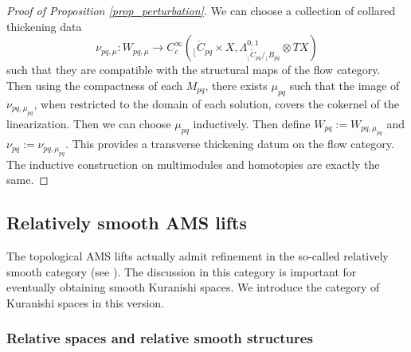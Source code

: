 \documentclass[reqno, 10pt]{amsart}
\numberwithin{equation}{section}
\numberwithin{equation}{section}
\theoremstyle{definition}
\theoremstyle{remark}
\newcommand{\beqn}{\begin{equation*}}
\newcommand{\eeqn}{\end{equation*}}
\renewcommand{\outer}{{}_{\lfloor}}
\begin{document}
\begin{proof}[Proof of Proposition \ref{prop_perturbation}]
We can choose a collection of collared thickening data
\beqn
\nu_{pq, \mu}: W_{pq, \mu} \to C_c^\infty( \outer \mathring C_{pq} \times X, \Lambda^{0,1}_{\outer \mathring C_{pq}/ \outer B_{pq}} \otimes TX)
\eeqn
such that they are compatible with the structural maps of the flow category. Then using the compactness of each $M_{pq}$, there exists $\mu_{pq}$ such that the image of $\nu_{pq, \mu_{pq}}$, when restricted to the domain of each solution, covers the cokernel of the linearization. Then we can choose $\mu_{pq}$ inductively. Then define $W_{pq}:= W_{pq, \mu_{pq}}$ and $\nu_{pq}:= \nu_{pq, \mu_{pq}}$. This provides a transverse thickening datum on the flow category. The inductive construction on multimodules and homotopies are exactly the same. 
\end{proof}









































\subsection{Relatively smooth AMS lifts}\label{subsection_relative_smooth}

The topological AMS lifts actually admit refinement in the so-called relatively smooth category (see \cite{Hirschi_Swaminathan}). The discussion in this category is important for eventually obtaining smooth Kuranishi spaces. We introduce the category of Kuranishi spaces in this version. 

\subsubsection{Relative spaces and relative smooth structures}
\end{document}
